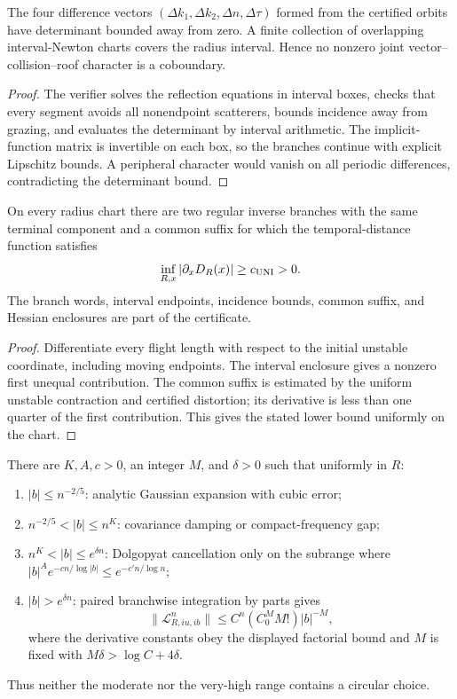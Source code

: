 \begin{proposition}
\label{prop:r11-a2-arithmetic}
The four difference vectors
$(\Delta k_1,\Delta k_2,\Delta n,\Delta\tau)$ formed from the certified
orbits have determinant bounded away from zero.  A finite collection of
overlapping interval-Newton charts covers the radius interval.  Hence no
nonzero joint vector--collision--roof character is a coboundary.
\end{proposition}

\begin{proof}
The verifier solves the reflection equations in interval boxes, checks that
every segment avoids all nonendpoint scatterers, bounds incidence away from
grazing, and evaluates the determinant by interval arithmetic.  The
implicit-function matrix is invertible on each box, so the branches continue
with explicit Lipschitz bounds.  A peripheral character would vanish on all
periodic differences, contradicting the determinant bound.
\end{proof}

\begin{theorem}
\label{thm:r11-a2-uni}
On every radius chart there are two regular inverse branches with the same
terminal component and a common suffix for which the temporal-distance
function satisfies
\[
 \inf_{R,x}|\partial_xD_R(x)|\ge c_{\rm UNI}>0.
\]
The branch words, interval endpoints, incidence bounds, common suffix, and
Hessian enclosures are part of the certificate.
\end{theorem}

\begin{proof}
Differentiate every flight length with respect to the initial unstable
coordinate, including moving endpoints.  The interval enclosure gives a
nonzero first unequal contribution.  The common suffix is estimated by the
uniform unstable contraction and certified distortion; its derivative is less
than one quarter of the first contribution.  This gives the stated lower
bound uniformly on the chart.
\end{proof}

\begin{theorem}
\label{thm:r11-a2-fourier}
There are $K,A,c>0$, an integer $M$, and $\delta>0$ such that uniformly in
$R$:
\begin{enumerate}[label=(\roman*)]
\item $|b|\le n^{-2/5}$: analytic Gaussian expansion with cubic error;
\item $n^{-2/5}<|b|\le n^K$: covariance damping or compact-frequency gap;
\item $n^K<|b|\le e^{\delta n}$: Dolgopyat cancellation only on the subrange
where $|b|^Ae^{-cn/\log|b|}\le e^{-c'n/\log n}$;
\item $|b|>e^{\delta n}$: paired branchwise integration by parts gives
\[
 \|\mathcal L_{R,iu,ib}^n\|
 \le C^n(C_0^MM!)|b|^{-M},
\]
where the derivative constants obey the displayed factorial bound and $M$ is
fixed with $M\delta>\log C+4\delta$.
\end{enumerate}
Thus neither the moderate nor the very-high range contains a circular choice.
\end{theorem}

